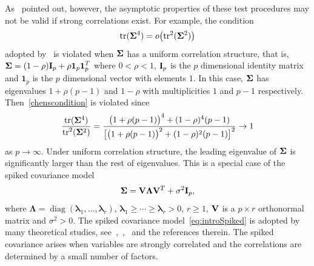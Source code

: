 \documentclass[review]{elsarticle}
\DeclareMathOperator{\mytr}{tr}
\DeclareMathOperator{\mydiag}{diag}
\newcommand{\bfsym}[1]{\ensuremath{\boldsymbol{#1}}}
\def\blambda {\bfsym {\lambda}}        \def\bLambda {\bfsym {\Lambda}}
\theoremstyle{plain}
\theoremstyle{definition}
\theoremstyle{remark}
\begin{document}
As~\cite{Ma2015A} pointed out, however, the asymptotic properties of these test procedures may not be valid if strong correlations exist. For example, the condition 
\begin{equation}\label{chenscondition}
    \mathrm{tr}(\bSigma^4)=o\big(\mathrm{tr}^2(\bSigma^2)\big)
\end{equation}
adopted by~\cite{Chen2010A} is violated when $\bSigma$ has a uniform correlation structure, that is, $\bSigma=(1-\rho)\BI_p+\rho\textbf{1}_p \textbf{1}_p^T$ where $0<\rho<1$, $\mathbf{I}_p$ is the $p$ dimensional identity matrix and $\bm{1}_p$ is the $p$ dimensional vector  with elements $1$.
In this case, $\bSigma$ has eigenvalues $1+\rho(p-1) $ and $1-\rho$ with multiplicities $1$ and $p-1$ respectively. Then~\eqref{chenscondition} is violated since 
$$
\frac{\mytr (\bSigma^4)}{\mytr^2(\bSigma^2)}=\frac{\big(1+\rho(p-1)\big)^4 + (1-\rho)^4 (p-1)}{\big[ \big(1+\rho(p-1)\big)^2+(1-\rho)^2 (p-1) \big]^2}\to 1
$$
as $p\to \infty$.
  Under uniform correlation structure, the leading eigenvalue of $\bSigma$ is significantly larger than the rest of eigenvalues.
  This is a special case of the spiked covariance model
 \begin{equation}\label{eq:introSpiked}
 \bSigma =\BV\bLambda \BV^T +\sigma^2 \BI_p,
 \end{equation}
 where $\bLambda=\mydiag(\blambda_1,\ldots,\blambda_r)$, $\blambda_1\geq \cdots\geq \blambda_r>0$, $r\geq 1$, $\mathbf{V}$ is a $p\times r$ orthonormal matrix and $\sigma^2>0$.
The spiked covariance model~\eqref{eq:introSpiked} is adopted by many theoretical studies, see~\cite{Cai2012Sparse},~\cite{Birnbaum2013},~\cite{Passemier2015} and the references therein.
The spiked covariance arises when variables are strongly correlated and the correlations are determined by a small number of factors.
\end{document}
